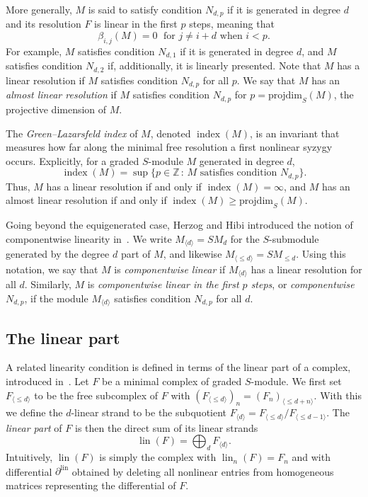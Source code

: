 \documentclass[a4paper,10pt]{amsart}
\theoremstyle{definition}
\theoremstyle{remark}
\DeclareMathOperator{\lin}{lin}
\newcommand{\pd}{\mathrm{projdim}}
\begin{document}
More generally, $M$ is said to satisfy condition $N_{d,p}$ if it is generated in degree $d$ and its resolution $F$ is linear in the first $p$ steps, meaning that
\[ 
\beta_{i,j}(M)=0 \; \text{ for } j\neq i+d \text{ when } i<p. 
\]
For example, $M$ satisfies condition $N_{d,1}$ if it is generated in degree $d$, and $M$ satisfies condition $N_{d,2}$ if, additionally, it is linearly presented. Note that $M$ has a linear resolution if $M$ satisfies condition $N_{d,p}$ for all $p$. We say that $M$ has an \emph{almost linear resolution} if $M$ satisfies condition $N_{d,p}$ for $p=\pd_S(M)$, the projective dimension of $M$. 

The \emph{Green--Lazarsfeld index} of $M$, denoted $\operatorname{index}(M)$, is an invariant that measures how far along the minimal free resolution a first nonlinear syzygy occurs. Explicitly, for a graded $S$-module $M$ generated in degree $d$,
\[ \operatorname{index}(M)= \sup\{p\in\mathbb{Z} \,:\, M \text{ satisfies condition } N_{d,p} \}. \]
Thus, $M$ has a linear resolution if and only if $\operatorname{index}(M)=\infty$, and $M$ has an almost linear resolution if and only if $\operatorname{index}(M) \geqslant \pd_S(M)$.
 
 Going beyond the equigenerated case, Herzog and Hibi introduced the notion of componentwise linearity in~\cite{HH}. We write $M_{\langle d\rangle} = SM_d$ for the $S$-submodule generated by the degree $d$ part of $M$, and likewise $M_{\langle \leqslant d\rangle}= SM_{ \leqslant d}$. Using this notation, we say that $M$ is \emph{componentwise linear} if $M_{\langle d\rangle}$ has a linear resolution for all $d$. Similarly, $M$ is \emph{componentwise linear in the first $p$ steps}, or \emph{componentwise $N_{d,p}$}, if the module $M_{\langle d\rangle}$ satisfies condition $N_{d,p}$ for all $d$.

    

\subsection*{The linear part}  A related linearity condition is defined in terms of the linear part of a complex, introduced in~\cite{EFS}.
Let $F$ be a minimal complex of graded $S$-module. We first set $F_{\langle \leqslant d\rangle}$ to be the free subcomplex of $F$ with $(F_{\langle \leqslant d\rangle})_n= (F_{n})_{ \langle \leqslant d+n\rangle}$.
With this we define the $d$-linear strand to be the subquotient $F_{\langle d\rangle} = F_{\langle \leqslant d\rangle}/F_{\langle \leqslant d-1\rangle}$. The \emph{linear part} of $F$ is then the direct sum of its linear strands
\[
\lin(F) = \bigoplus_d F_{\langle d\rangle}.
\]
Intuitively, $\lin(F)$ is simply the complex with  $\lin_n(F)=F_n$ and with differential $\partial^{\lin}$ obtained by deleting all nonlinear entries from homogeneous matrices representing the differential of $F$.
\end{document}
